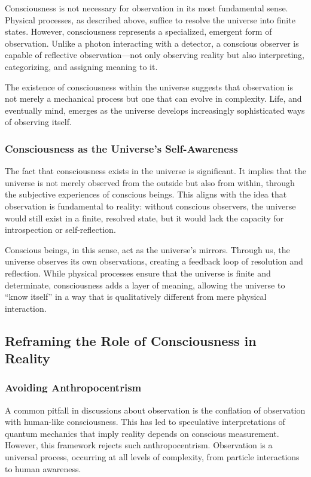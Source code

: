 \documentclass[12pt]{article}
\begin{document}
Consciousness is not necessary for observation in its most fundamental sense. Physical processes, as described above, suffice to resolve the universe into finite states. However, consciousness represents a specialized, emergent form of observation. Unlike a photon interacting with a detector, a conscious observer is capable of reflective observation—not only observing reality but also interpreting, categorizing, and assigning meaning to it.

The existence of consciousness within the universe suggests that observation is not merely a mechanical process but one that can evolve in complexity. Life, and eventually mind, emerges as the universe develops increasingly sophisticated ways of observing itself.

\subsubsection{Consciousness as the Universe’s Self-Awareness}

The fact that consciousness exists in the universe is significant. It implies that the universe is not merely observed from the outside but also from within, through the subjective experiences of conscious beings. This aligns with the idea that observation is fundamental to reality: without conscious observers, the universe would still exist in a finite, resolved state, but it would lack the capacity for introspection or self-reflection.

Conscious beings, in this sense, act as the universe’s mirrors. Through us, the universe observes its own observations, creating a feedback loop of resolution and reflection. While physical processes ensure that the universe is finite and determinate, consciousness adds a layer of meaning, allowing the universe to ``know itself'' in a way that is qualitatively different from mere physical interaction.

\subsection{Reframing the Role of Consciousness in Reality}

\subsubsection{Avoiding Anthropocentrism}

A common pitfall in discussions about observation is the conflation of observation with human-like consciousness. This has led to speculative interpretations of quantum mechanics that imply reality depends on conscious measurement. However, this framework rejects such anthropocentrism. Observation is a universal process, occurring at all levels of complexity, from particle interactions to human awareness.
\end{document}
